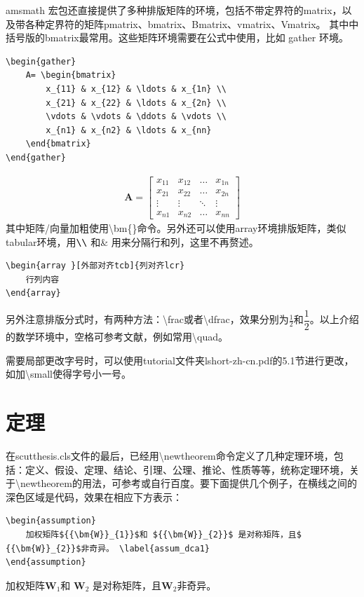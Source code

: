 amsmath 宏包还直接提供了多种排版矩阵的环境，包括不带定界符的matrix，以及带各种定界符的矩阵pmatrix、bmatrix、Bmatrix、vmatrix、Vmatrix。
其中中括号版的bmatrix最常用。这些矩阵环境需要在公式中使用，比如 gather 环境。
\begin{lstlisting}
\begin{gather}
	A= \begin{bmatrix}
		x_{11} & x_{12} & \ldots & x_{1n} \\
		x_{21} & x_{22} & \ldots & x_{2n} \\
		\vdots & \vdots & \ddots & \vdots \\
		x_{n1} & x_{n2} & \ldots & x_{nn}
	\end{bmatrix}
\end{gather}
\end{lstlisting}
\begin{gather}
\bm{A}= \begin{bmatrix}
	x_{11} & x_{12} & \ldots & x_{1n} \\
	x_{21} & x_{22} & \ldots & x_{2n} \\
	\vdots & \vdots & \ddots & \vdots \\
	x_{n1} & x_{n2} & \ldots & x_{nn}
   \end{bmatrix}
\end{gather}	
其中矩阵/向量加粗使用\textbackslash{}bm\{\}命令。另外还可以使用array环境排版矩阵，类似tabular环境，用$ \verb|\\|$ 和\& 用来分隔行和列，这里不再赘述。	
\begin{lstlisting}
\begin{array }[外部对齐tcb]{列对齐lcr}
	行列内容
\end{array}
\end{lstlisting}

另外注意排版分式时，有两种方法：\textbackslash{}frac或者\textbackslash{}dfrac，效果分别为$ \frac{1}{2} $和$ \dfrac{1}{2} $。以上介绍的数学环境中，空格可参考文献\parencite{_c}，例如常用\textbackslash{}quad。

需要局部更改字号时，可以使用tutorial文件夹lshort-zh-cn.pdf的5.1节进行更改，如加\textbackslash{}small使得字号小一号。
\section{定理}
在scutthesis.cls文件的最后，已经用\textbackslash{}newtheorem命令定义了几种定理环境，包括：定义、假设、定理、结论、引理、公理、推论、性质等等，统称定理环境，关于\textbackslash{}newtheorem的用法，可参考\cite{_g,_c}或自行百度。要下面提供几个例子，在横线之间的深色区域是代码，效果在相应下方表示：
\begin{lstlisting}
\begin{assumption}
	加权矩阵${{\bm{W}}_{1}}$和 ${{\bm{W}}_{2}}$ 是对称矩阵，且$ {{\bm{W}}_{2}}$非奇异。	\label{assum_dca1}
\end{assumption}
\end{lstlisting}
\begin{assumption}
	加权矩阵${{\bm{W}}_{1}}$和 ${{\bm{W}}_{2}}$ 是对称矩阵，且$ {{\bm{W}}_{2}}$非奇异。	\label{assum_dca1}
\end{assumption}

